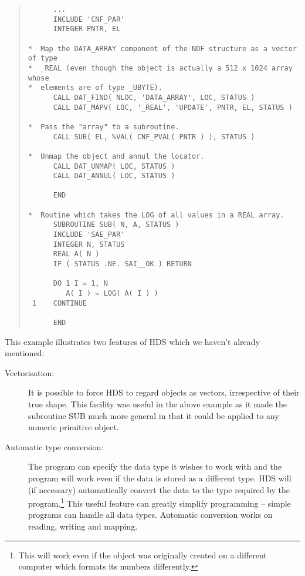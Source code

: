 \documentclass[twoside,11pt]{article}
\newcommand{\htmlref}[2]{#1}
\renewcommand{\_}{\texttt{\symbol{95}}}
\begin{document}
\small
\begin{quote}
\label{example:mapping}
\begin{verbatim}
      ...
      INCLUDE 'CNF_PAR'
      INTEGER PNTR, EL

*  Map the DATA_ARRAY component of the NDF structure as a vector of type
*  _REAL (even though the object is actually a 512 x 1024 array whose
*  elements are of type _UBYTE).
      CALL DAT_FIND( NLOC, 'DATA_ARRAY', LOC, STATUS )
      CALL DAT_MAPV( LOC, '_REAL', 'UPDATE', PNTR, EL, STATUS )

*  Pass the "array" to a subroutine.
      CALL SUB( EL, %VAL( CNF_PVAL( PNTR ) ), STATUS )

*  Unmap the object and annul the locator.
      CALL DAT_UNMAP( LOC, STATUS )
      CALL DAT_ANNUL( LOC, STATUS )

      END

*  Routine which takes the LOG of all values in a REAL array.
      SUBROUTINE SUB( N, A, STATUS )
      INCLUDE 'SAE_PAR'
      INTEGER N, STATUS
      REAL A( N )
      IF ( STATUS .NE. SAI__OK ) RETURN

      DO 1 I = 1, N
         A( I ) = LOG( A( I ) )
 1    CONTINUE

      END
\end{verbatim}
\end{quote}
\normalsize

This example illustrates two features of HDS which we haven't already
mentioned:

\begin{description}

\item [Vectorisation:]
It is possible to force HDS to regard objects as vectors, irrespective
of their true \htmlref{shape}{sect:shape}. This facility was useful in
the above example as it made the subroutine SUB much more general in
that it could be applied to any numeric primitive object.

\item [\label{sect:typeconversion}Automatic type conversion:]
The program can specify the data type it wishes to work with and the
program will work even if the data is stored as a different
\htmlref{type}{sect:type}. HDS will (if necessary) automatically
convert the data to the type required by the program.\footnote{This
will work even if the object was originally created on a different
computer which formats its numbers differently.} This useful feature
can greatly simplify programming -- simple programs can handle all
data types.  Automatic conversion works on reading, writing and
mapping.

\end{description}
\end{document}
